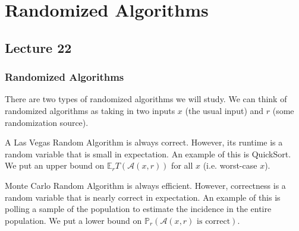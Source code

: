\section{Randomized Algorithms}
\subsection{Lecture 22}
\subsubsection{Randomized Algorithms}

There are two types of randomized algorithms we will study.
We can think of randomized algorithms as taking in two inputs $x$ (the usual input) and $r$ (some randomization source).

\begin{definition}
    A Las Vegas Random Algorithm is always correct. However, its runtime is a random variable that is small in expectation. An example of this is QuickSort. We put an upper bound on $\mathbb{E}_r{T(\mathcal{A}(x, r))}$ for all $x$ (i.e. worst-case $x$).
\end{definition}

\begin{definition}
    Monte Carlo Random Algorithm is always efficient. However, correctness is a random variable that is nearly correct in expectation. An example of this is polling a sample of the population to estimate the incidence in the entire population. We put a lower bound on $\mathbb{P}_r(\mathcal{A}(x, r) \text{ is correct})$.
\end{definition}

